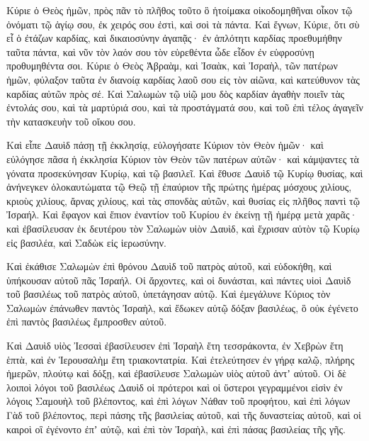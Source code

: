 {Κύριε ὁ Θεὸς ἡμῶν, πρὸς πᾶν τὸ πλῆθος τοῦτο ὃ ἡτοίμακα οἰκοδομηθῆναι οἶκον τῷ ὀνόματι τῷ ἁγίῳ σου, ἐκ χειρός σου ἐστὶ, καὶ σοὶ τὰ πάντα.
Καὶ ἔγνων, Κύριε, ὅτι σὺ εἶ ὁ ἐτάζων καρδίας, καὶ δικαιοσύνην ἀγαπᾷς· ἐν ἁπλότητι καρδίας προεθυμήθην ταῦτα πάντα, καὶ νῦν τὸν λαόν σου τὸν εὑρεθέντα ὧδε εἶδον ἐν εὐφροσύνῃ προθυμηθέντα σοι.
Κύριε ὁ Θεὸς Ἁβραὰμ, καὶ Ἰσαὰκ, καὶ Ἰσραὴλ, τῶν πατέρων ἡμῶν, φύλαξον ταῦτα ἐν διανοίᾳ καρδίας λαοῦ σου εἰς τὸν αἰῶνα, καὶ κατεύθυνον τὰς καρδίας αὐτῶν πρὸς σέ.
Καὶ Σαλωμὼν τῷ υἱῷ μου δὸς καρδίαν ἀγαθὴν ποιεῖν τὰς ἐντολάς σου, καὶ τὰ μαρτύριά σου, καὶ τὰ προστάγματά σου, καὶ τοῦ ἐπὶ τέλος ἀγαγεῖν τὴν κατασκευὴν τοῦ οἴκου σου.
\par }{\PP {}Καὶ εἶπε Δαυὶδ πάσῃ τῇ ἐκκλησίᾳ, εὐλογήσατε Κύριον τὸν Θεὸν ἡμῶν· καὶ εὐλόγησε πᾶσα ἡ ἐκκλησία Κύριον τὸν Θεὸν τῶν πατέρων αὐτῶν· καὶ κάμψαντες τὰ γόνατα προσεκύνησαν Κυρίῳ, καὶ τῷ βασιλεῖ.
Καὶ ἔθυσε Δαυὶδ τῷ Κυρίῳ θυσίας, καὶ ἀνήνεγκεν ὁλοκαυτώματα τῷ Θεῷ τῇ ἐπαύριον τῆς πρώτης ἡμέρας μόσχους χιλίους, κριοὺς χιλίους, ἄρνας χιλίους, καὶ τὰς σπονδὰς αὐτῶν, καὶ θυσίας εἰς πλῆθος παντὶ τῷ Ἰσραήλ.
Καὶ ἔφαγον καὶ ἔπιον ἐναντίον τοῦ Κυρίου ἐν ἐκείνῃ τῇ ἡμέρᾳ μετὰ χαρᾶς· καὶ ἐβασίλευσαν ἐκ δευτέρου τὸν Σαλωμὼν υἱὸν Δαυὶδ, καὶ ἔχρισαν αὐτὸν τῷ Κυρίῳ εἰς βασιλέα, καὶ Σαδὼκ εἰς ἱερωσύνην.
\par }{\PP {}Καὶ ἐκάθισε Σαλωμὼν ἐπὶ θρόνου Δαυὶδ τοῦ πατρὸς αὐτοῦ, καὶ εὐδοκήθη, καὶ ὑπήκουσαν αὐτοῦ πᾶς Ἰσραήλ.
Οἱ ἄρχοντες, καὶ οἱ δυνάσται, καὶ πάντες υἱοὶ Δαυὶδ τοῦ βασιλέως τοῦ πατρὸς αὐτοῦ, ὑπετάγησαν αὐτῷ.
Καὶ ἐμεγάλυνε Κύριος τὸν Σαλωμὼν ἐπάνωθεν παντὸς Ἰσραὴλ, καὶ ἔδωκεν αὐτῷ δόξαν βασιλέως, ὃ οὐκ ἐγένετο ἐπὶ παντὸς βασιλέως ἔμπροσθεν αὐτοῦ.
\par }{\PP {}Καὶ Δαυὶδ υἱὸς Ἰεσσαὶ ἐβασίλευσεν ἐπὶ Ἰσραὴλ
ἔτη τεσσράκοντα, ἐν Χεβρὼν ἔτη ἑπτὰ, καὶ ἐν Ἱερουσαλὴμ ἔτη τριακοντατρία.
Καὶ ἐτελεύτησεν ἐν γήρᾳ καλῷ, πλήρης ἡμερῶν, πλούτῳ καὶ δόξῃ, καὶ ἐβασίλευσε Σαλωμὼν υἱὸς αὐτοῦ ἀντʼ αὐτοῦ.
Οἱ δὲ λοιποὶ λόγοι τοῦ βασιλέως Δαυὶδ οἱ πρότεροι καὶ οἱ ὕστεροι γεγραμμένοι εἰσὶν ἐν λόγοις Σαμουὴλ τοῦ βλέποντος, καὶ ἐπὶ λόγων Νάθαν τοῦ προφήτου, καὶ ἐπὶ λόγων Γὰδ τοῦ βλέποντος,
περὶ πάσης τῆς βασιλείας αὐτοῦ, καὶ τῆς δυναστείας αὐτοῦ, καὶ οἱ καιροὶ οἳ ἐγένοντο ἐπʼ αὐτῷ, καὶ ἐπὶ τὸν Ἰσραὴλ, καὶ ἐπὶ πάσας βασιλείας τῆς γῆς.
\par }